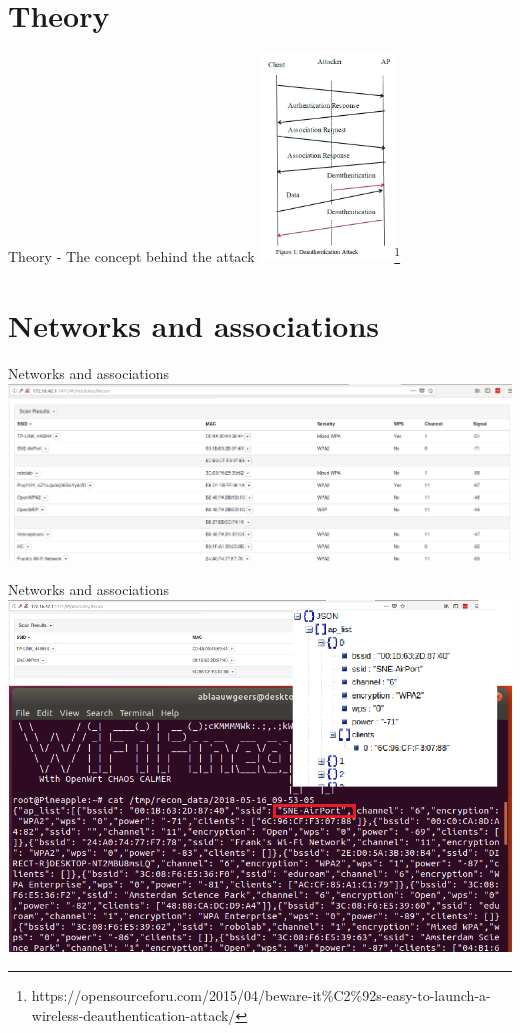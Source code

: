 \documentclass[10pt]{beamer}
\begin{document}
\section{Theory}
\begin{frame}{Theory - The concept behind the attack}
\centering
\includegraphics[width=135px]{dewifi.jpg}\footnote{\tiny{https://opensourceforu.com/2015/04/beware-it\%C2\%92s-easy-to-launch-a-wireless-deauthentication-attack/}}

\end{frame}

\section{Networks and associations}
\begin{frame}{Networks and associations}
\centering
\includegraphics[width=\textwidth]{recon1.png}
\end{frame}

\begin{frame}{Networks and associations}
\centering
\includegraphics[width=\textwidth]{JSONx.png}
\end{frame}
\end{document}
